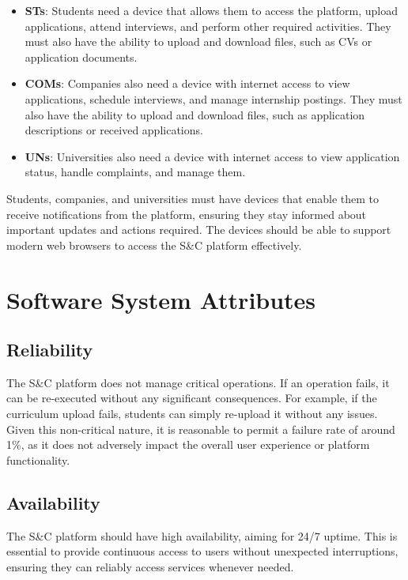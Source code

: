 \begin{itemize}
    \item \textbf{STs}: Students need a device that allows them to access the platform, upload applications, attend interviews, and perform other required activities. They must also have the ability to upload and download files, such as CVs or application documents. 

    \item \textbf{COMs}: Companies also need a device with internet access to view applications, schedule interviews, and manage internship postings. They must also have the ability to upload and download files, such as application descriptions or received applications.

    \item \textbf{UNs}: Universities also need a device with internet access to view application status, handle complaints, and manage them. 
\end{itemize}

Students, companies, and universities must have devices that enable them to receive notifications from the platform, ensuring they stay informed about important updates and actions required. The devices should be able to support modern web browsers to access the S\&C platform effectively.


\pagebreak
\section{Software System Attributes}
\subsection{Reliability}

The S\&C platform does not manage critical operations. If an operation fails, it can be re-executed without any significant consequences. For example, if the curriculum upload fails, students can simply re-upload it without any issues. Given this non-critical nature, it is reasonable to permit a failure rate of around 1\%, as it does not adversely impact the overall user experience or platform functionality.
 
\subsection{Availability}

The S\&C platform should have high availability, aiming for 24/7 uptime. This is essential to provide continuous access to users without unexpected interruptions, ensuring they can reliably access services whenever needed.

